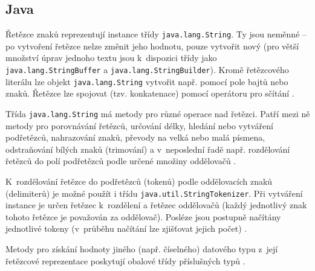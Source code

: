 \documentclass[czech,BP]{thesiskiv}
\begin{document}
\subsection{Java}
Řetězce znaků reprezentují instance třídy \texttt{java.lang.String}. Ty jsou neměnné -- po vytvoření řetězce nelze změnit jeho hodnotu, pouze vytvořit nový (pro větší množství úprav jednoho textu jsou k~dispozici třídy jako \texttt{java.lang.StringBuffer} a \texttt{java.lang.StringBuilder}). Kromě řetězcového literálu lze objekt \texttt{java.lang.String} vytvořit např. pomocí pole bajtů nebo znaků. Řetězce lze spojovat (tzv. konkatenace) pomocí operátoru pro sčítání \uv{+} \cite{java-guide-strings, java-guide-string, java-guide-stringbuffer, java-guide-stringbuilder}.\par
Třída \texttt{java.lang.String} má metody pro různé operace nad řetězci. Patří mezi ně metody pro porovnávání řetězců, určování délky, hledání nebo vytváření podřetězců, nahrazování znaků, převody na velká nebo malá písmena, odstraňování bílých znaků (trimování) a v~neposlední řadě např. rozdělování řetězců do polí podřetězců podle určené množiny oddělovačů \cite{java-guide-string}.\par
K~rozdělování řetězce do podřetězců (tokenů) podle oddělovacích znaků (delimiterů) je možné použít i třídu \texttt{java.util.StringTokenizer}. Při vytváření instance je určen řetězec k~rozdělení a řetězec oddělovačů (každý jednotlivý znak tohoto řetězce je považován za oddělovač). Posléze jsou postupně načítány jednotlivé tokeny (v~průběhu načítání lze zjišťovat jejich počet) \cite{java-guide-stringtokenizer}.\par
Metody pro získání hodnoty jiného (např. číselného) datového typu z~její řetězcové reprezentace poskytují obalové třídy příslušných typů \cite{java-guide-string, java-guide-byte, java-guide-short, java-guide-integer, java-guide-long, java-guide-float, java-guide-double, java-guide-boolean, java-guide-character}.
\end{document}
